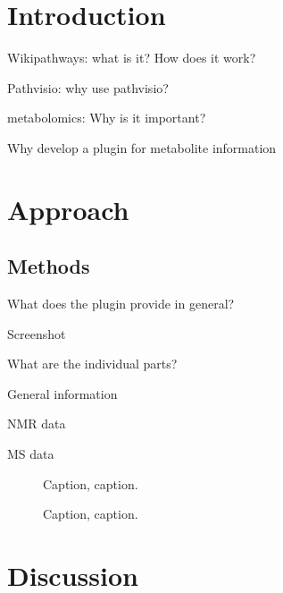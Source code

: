 \documentclass{bioinfo}
\begin{document}
\section{Introduction}
Wikipathways: what is it? How does it work?

Pathvisio: why use pathvisio?

metabolomics: Why is it important?

Why develop a plugin for metabolite information

\section{Approach}


\begin{methods}
\section{Methods}

What does the plugin provide in general?

Screenshot

What are the individual parts?

General information

NMR data

MS data

\end{methods}

\begin{figure}[!tpb]%
\caption{Caption, caption.}\label{fig:01}
\end{figure}

\begin{figure}[!tpb]%
\caption{Caption, caption.}\label{fig:02}
\end{figure}

\section{Discussion}




%
%
\end{document}
